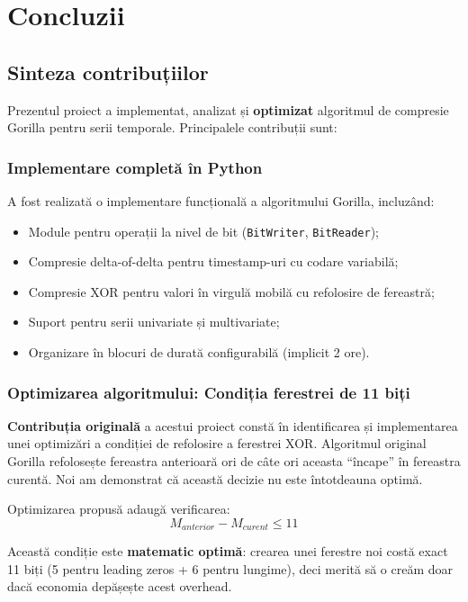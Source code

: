 \chapter{Concluzii}

\section{Sinteza contribuțiilor}

Prezentul proiect a implementat, analizat și \textbf{optimizat} algoritmul de compresie Gorilla pentru serii temporale. Principalele contribuții sunt:

\subsection{Implementare completă în Python}

A fost realizată o implementare funcțională a algoritmului Gorilla, incluzând:
\begin{itemize}
    \item Module pentru operații la nivel de bit (\texttt{BitWriter}, \texttt{BitReader});
    \item Compresie delta-of-delta pentru timestamp-uri cu codare variabilă;
    \item Compresie XOR pentru valori în virgulă mobilă cu refolosire de fereastră;
    \item Suport pentru serii univariate și multivariate;
    \item Organizare în blocuri de durată configurabilă (implicit 2 ore).
\end{itemize}

\subsection{Optimizarea algoritmului: Condiția ferestrei de 11 biți}

\textbf{Contribuția originală} a acestui proiect constă în identificarea și implementarea unei optimizări a condiției de refolosire a ferestrei XOR. Algoritmul original Gorilla refolosește fereastra anterioară ori de câte ori aceasta ``încape'' în fereastra curentă. Noi am demonstrat că această decizie nu este întotdeauna optimă.

Optimizarea propusă adaugă verificarea:
\begin{equation}
    M_{anterior} - M_{curent} \leq 11
\end{equation}

Această condiție este \textbf{matematic optimă}: crearea unei ferestre noi costă exact 11 biți (5 pentru leading zeros + 6 pentru lungime), deci merită să o creăm doar dacă economia depășește acest overhead.

